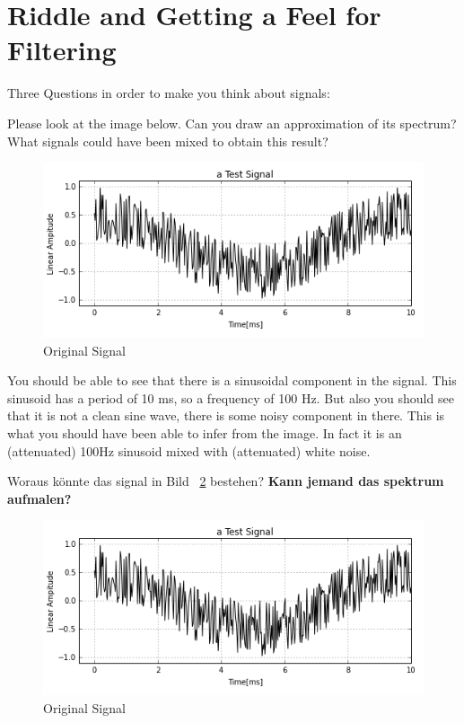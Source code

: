 \section{Riddle and Getting a Feel for Filtering}

Three Questions in order to make you think about signals:


\begin{question}
	Please look at the image below. Can you draw an approximation of its spectrum? What signals could have been mixed to obtain this result?
\begin{figure}[H]
	\begin{center}
		\includegraphics[width = 14cm]{raetsel_original.png}
		\caption{Original Signal}
		\label{fig:originalSignal}
	\end{center}
\end{figure}
\end{question}


\begin{Answer}
You should be able to see that there is a sinusoidal component in the signal. This sinusoid has a period of 10 ms, so a frequency of 100 Hz. But also you should see that it is not a clean sine wave, there is some noisy component in there. This is what you should have been able to infer from the image. In fact it is an (attenuated) 100Hz sinusoid mixed with (attenuated) white noise.
\end{Answer}


Woraus könnte das signal in Bild ~\ref{fig:originalSignal} bestehen?
\textbf{Kann jemand das spektrum aufmalen?}
\begin{figure}[H]
	\begin{center}
		\includegraphics[width = 14cm]{raetsel_original.png}
		\caption{Original Signal}
		\label{fig:originalSignal}
	\end{center}
\end{figure}

